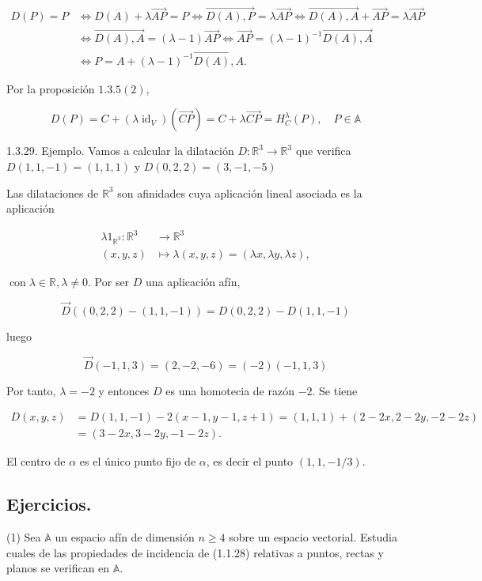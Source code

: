 \documentclass[12pt, a4paper, ones, notitlepage, openany,titlepage]{article}
\begin{document}
$$
\begin{aligned}
D(P)=P & \Longleftrightarrow D(A)+\lambda \overrightarrow{A P}=P \Longleftrightarrow \overrightarrow{D(A), P}=\lambda \overrightarrow{A P} \Longleftrightarrow \overrightarrow{D(A), A}+\overrightarrow{A P}=\lambda \overrightarrow{A P} \\
& \Longleftrightarrow \overrightarrow{D(A), A}=(\lambda-1) \overrightarrow{A P} \Longleftrightarrow \overrightarrow{A P}=(\lambda-1)^{-1} \overrightarrow{D(A), A} \\
& \Longleftrightarrow P=A+(\lambda-1)^{-1} \overrightarrow{D(A), A} .
\end{aligned}
$$

Por la proposición $1.3 .5(2)$,

$$
D(P)=C+\left(\lambda \operatorname{id}_{V}\right)(\overrightarrow{C P})=C+\lambda \overrightarrow{C P}=H_{C}^{\lambda}(P), \quad P \in \mathbb{A}
$$

1.3.29. Ejemplo. Vamos a calcular la dilatación $D: \mathbb{R}^{3} \rightarrow \mathbb{R}^{3}$ que verifica $D(1,1,-1)=(1,1,1)$ y $D(0,2,2)=(3,-1,-5)$

Las dilataciones de $\mathbb{R}^{3}$ son afinidades cuya aplicación lineal asociada es la aplicación

$$
\begin{aligned}
\lambda 1_{\mathbb{R}^{3}}: \mathbb{R}^{3} & \longrightarrow \mathbb{R}^{3} \\
(x, y, z) & \longmapsto \lambda(x, y, z)=(\lambda x, \lambda y, \lambda z),
\end{aligned}
$$

$\operatorname{con} \lambda \in \mathbb{R}, \lambda \neq 0$. Por ser $D$ una aplicación afín,

$$
\vec{D}((0,2,2)-(1,1,-1))=D(0,2,2)-D(1,1,-1)
$$

luego

$$
\vec{D}(-1,1,3)=(2,-2,-6)=(-2)(-1,1,3)
$$

Por tanto, $\lambda=-2$ y entonces $D$ es una homotecia de razón $-2$. Se tiene

$$
\begin{aligned}
D(x, y, z) & =D(1,1,-1)-2(x-1, y-1, z+1)=(1,1,1)+(2-2 x, 2-2 y,-2-2 z) \\
& =(3-2 x, 3-2 y,-1-2 z) .
\end{aligned}
$$

El centro de $\alpha$ es el único punto fijo de $\alpha$, es decir el punto $(1,1,-1 / 3)$.

\subsection{Ejercicios.}
(1) Sea $\mathbb{A}$ un espacio afín de dimensión $n \geq 4$ sobre un espacio vectorial. Estudia cuales de las propiedades de incidencia de (1.1.28) relativas a puntos, rectas y planos se verifican en $\mathbb{A}$.
\end{document}

